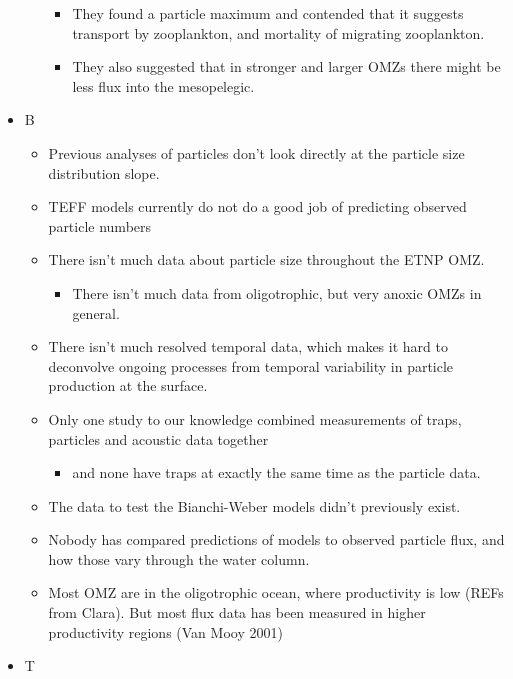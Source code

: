 \documentclass[]{article}
\providecommand{\tightlist}{%
  \setlength{\itemsep}{0pt}\setlength{\parskip}{0pt}}
\begin{document}
\begin{itemize}
\begin{itemize}
    \begin{itemize}
    \tightlist
    \item
      They found a particle maximum and contended that it suggests
      transport by zooplankton, and mortality of migrating zooplankton.
    \item
      They also suggested that in stronger and larger OMZs there might
      be less flux into the mesopelegic.
    \end{itemize}
  \end{itemize}
\item
  B

  \begin{itemize}
  \tightlist
  \item
    Previous analyses of particles don't look directly at the particle
    size distribution slope.
  \item
    TEFF models currently do not do a good job of predicting observed
    particle numbers
  \item
    There isn't much data about particle size throughout the ETNP OMZ.

    \begin{itemize}
    \tightlist
    \item
      There isn't much data from oligotrophic, but very anoxic OMZs in
      general.
    \end{itemize}
  \item
    There isn't much resolved temporal data, which makes it hard to
    deconvolve ongoing processes from temporal variability in particle
    production at the surface.
  \item
    Only one study to our knowledge combined measurements of traps,
    particles and acoustic data together

    \begin{itemize}
    \tightlist
    \item
      and none have traps at exactly the same time as the particle data.
    \end{itemize}
  \item
    The data to test the Bianchi-Weber models didn't previously exist.
  \item
    Nobody has compared predictions of models to observed particle flux,
    and how those vary through the water column.
  \item
    Most OMZ are in the oligotrophic ocean, where productivity is low
    (REFs from Clara). But most flux data has been measured in higher
    productivity regions (Van Mooy 2001)
  \end{itemize}
\item
  T


\end{itemize}
\end{document}
